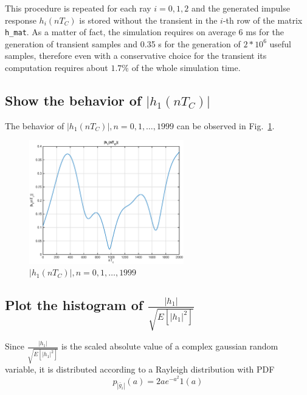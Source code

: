 \documentclass[10pt]{article}
\begin{document}
This procedure is repeated for each ray $i = 0, 1, 2$ and the generated impulse response $h_i(nT_C)$ is stored without the transient in the $i$-th row of the matrix \texttt{h\_mat}. As a matter of fact, the simulation requires on average 6 ms for the generation of transient samples and 0.35 s for the generation of $2*10^6$ useful samples, therefore even with a conservative choice for the transient its computation requires about $1.7\%$ of the whole simulation time.


\subsection*{Show the behavior of $|h_1(nT_C)|$}
The behavior of $|h_1(nT_C)|, n = 0, 1, \dots, 1999$ can be observed in Fig.~\ref{fig:h1}.

\begin{figure}[h!]
  \centering
  \includegraphics[width = 0.6\textwidth]{p01_h1}
  \caption{$|h_1(nT_C)|, n = 0, 1, \dots, 1999$}
  \label{fig:h1}
\end{figure}

\subsection*{Plot the histogram of $\frac{|h_1|}{\sqrt{E[|h_1|^2]}}$}
Since $\frac{|h_1|}{\sqrt{E[|h_1|^2]}}$ is the scaled absolute value of a complex gaussian random variable, it is distributed according to a Rayleigh distribution with PDF
$$p_{|\bar{g}_i|}(a) = 2a e^{-a^2} 1(a)$$
\end{document}
